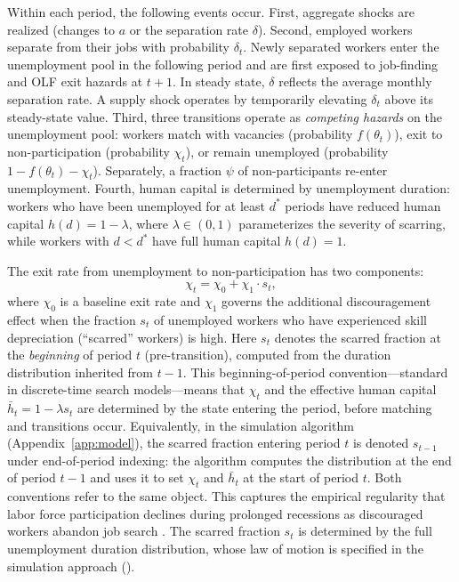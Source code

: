 \documentclass[12pt]{article}
\begin{document}
Within each period, the following events occur. First, aggregate shocks are realized (changes to $a$ or the separation rate $\delta$). Second, employed workers separate from their jobs with probability $\delta_t$. Newly separated workers enter the unemployment pool in the following period and are first exposed to job-finding and OLF exit hazards at $t+1$. In steady state, $\delta$ reflects the average monthly separation rate. A supply shock operates by temporarily elevating $\delta_t$ above its steady-state value. Third, three transitions operate as \textit{competing hazards} on the unemployment pool: workers match with vacancies (probability $f(\theta_t)$), exit to non-participation (probability $\chi_t$), or remain unemployed (probability $1 - f(\theta_t) - \chi_t$). Separately, a fraction $\psi$ of non-participants re-enter unemployment. Fourth, human capital is determined by unemployment duration: workers who have been unemployed for at least $d^*$ periods have reduced human capital $h(d) = 1 - \lambda$, where $\lambda \in (0,1)$ parameterizes the severity of scarring, while workers with $d < d^*$ have full human capital $h(d) = 1$.

The exit rate from unemployment to non-participation has two components:
\begin{equation}
\chi_t = \chi_0 + \chi_1 \cdot s_t,
\label{eq:exit_rate}
\end{equation}
where $\chi_0$ is a baseline exit rate and $\chi_1$ governs the additional discouragement effect when the fraction $s_t$ of unemployed workers who have experienced skill depreciation (``scarred'' workers) is high. Here $s_t$ denotes the scarred fraction at the \textit{beginning} of period $t$ (pre-transition), computed from the duration distribution inherited from $t-1$. This beginning-of-period convention---standard in discrete-time search models---means that $\chi_t$ and the effective human capital $\bar{h}_t = 1 - \lambda s_t$ are determined by the state entering the period, before matching and transitions occur. Equivalently, in the simulation algorithm (Appendix~\ref{app:model}), the scarred fraction entering period $t$ is denoted $s_{t-1}$ under end-of-period indexing: the algorithm computes the distribution at the end of period $t-1$ and uses it to set $\chi_t$ and $\bar{h}_t$ at the start of period $t$. Both conventions refer to the same object. This captures the empirical regularity that labor force participation declines during prolonged recessions as discouraged workers abandon job search \citep{elsby2010labor, kroft2016long}. The scarred fraction $s_t$ is determined by the full unemployment duration distribution, whose law of motion is specified in the simulation approach ().
\end{document}
